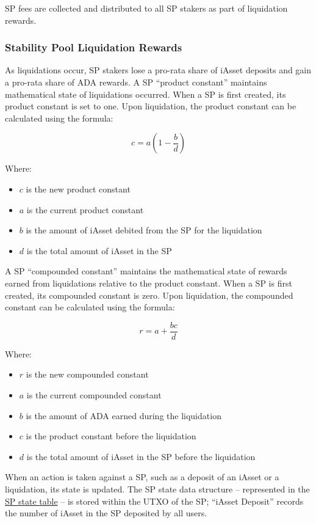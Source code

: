 \documentclass{article}
\begin{document}
\begin{sloppypar}
SP fees are collected and distributed to all SP stakers as part of
liquidation rewards.

\hypertarget{stability-pool-liquidation-rewards}{%
\subsubsection{Stability Pool Liquidation
Rewards}\label{stability-pool-liquidation-rewards}}

As liquidations occur, SP stakers lose a pro-rata share of iAsset
deposits and gain a pro-rata share of ADA rewards. A SP ``product
constant'' maintains mathematical state of liquidations occurred. When a
SP is first created, its product constant is set to one. Upon
liquidation, the product constant can be calculated using the formula:

\[c=a\left ( 1 - \frac{b}{d} \right )\]

Where:

\begin{itemize}
\item
  \(c\) is the new product constant
\item
  \(a\) is the current product constant
\item
  \(b\) is the amount of iAsset debited from the SP for the liquidation
\item
  \(d\) is the total amount of iAsset in the SP
\end{itemize}

A SP ``compounded constant'' maintains the mathematical state of rewards
earned from liquidations relative to the product constant. When a SP is
first created, its compounded constant is zero. Upon liquidation, the
compounded constant can be calculated using the formula:

\[r = a + \frac{bc}{d}\]

Where:

\begin{itemize}
\item
  \(r\) is the new compounded constant
\item
  \(a\) is the current compounded constant
\item
  \(b\) is the amount of ADA earned during the liquidation
\item
  \(c\) is the product constant before the liquidation
\item
  \(d\) is the total amount of iAsset in the SP before the liquidation
\end{itemize}

When an action is taken against a SP, such as a deposit of an iAsset or
a liquidation, its state is updated. The SP state data structure --
represented in the \protect\hyperlink{stability-pool-state}{SP state
table} -- is stored within the UTXO of the SP; ``iAsset Deposit''
records the number of iAsset in the SP deposited by all users.


\end{sloppypar}
\end{document}
